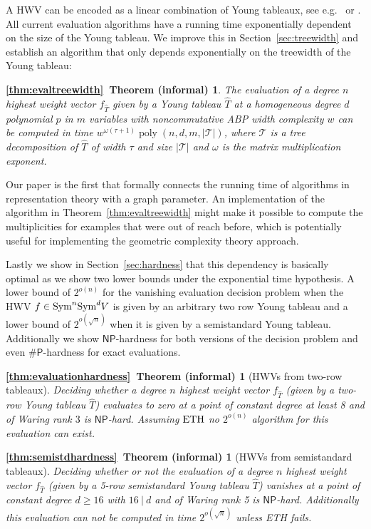 \documentclass[10pt,a4paper]{article}
\numberwithin{equation}{section}
\newtheorem*{theorem*thm:evaltreewidth}{\ref{thm:evaltreewidth}~Theorem (informal)}
\newtheorem*{theorem*thm:evaluationhardness}{\ref{thm:evaluationhardness}~Theorem (informal)}
\newtheorem*{theorem*thm:semistdhardness}{\ref{thm:semistdhardness}~Theorem (informal)}
\theoremstyle{definition}
\newcommand{\Sym}{\textup{Sym}}
\newcommand{\CT}{\mathcal{T}}
\newcommand{\PP}{\ensuremath{\mathsf{P}}}
\newcommand{\NP}{\ensuremath{\mathsf{NP}}}
\newcommand{\ETH}{\ensuremath{\textup{ETH}}}
\DeclareMathOperator{\poly}{poly}
\begin{document}
A HWV can be encoded as a linear combination of Young tableaux, see e.g.~\cite[\S3.9]{Ott:13} or \cite[Sec.~4.3]{ike:12b}.
All current evaluation algorithms have a running time exponentially dependent on the size of the Young tableau.
We improve this in Section~\ref{sec:treewidth} and establish an algorithm that only depends exponentially on the treewidth of the Young tableau:
\begin{theorem*thm:evaltreewidth}
The evaluation of a degree $n$ highest weight vector $f_{\hat T}$ given by a Young tableau $\hat{T}$ 
at a homogeneous degree $d$ polynomial $p$ in $m$ variables with noncommutative ABP width complexity $w$ can be computed in time $w^{\omega(\tau+1)}\poly(n,d,m,|\CT|)$,
where $\CT$ is a tree decomposition of $\hat T$ of width $\tau$ and size $|\CT|$ and $\omega$ is the matrix multiplication exponent.
\end{theorem*thm:evaltreewidth}

Our paper is the first that formally connects the running time of algorithms in representation theory with a graph parameter. An implementation of the algorithm in Theorem~\ref{thm:evaltreewidth} might make it possible to compute the multiplicities for examples that were out of reach before, which is potentially useful for implementing the geometric complexity theory approach.

Lastly we show in Section~\ref{sec:hardness} that this dependency is basically optimal as we show two lower bounds under the exponential time hypothesis.
A lower bound of $2^{o(n)}$ for the vanishing evaluation decision problem when the HWV $f \in \Sym^n\Sym^d V$ is given by an arbitrary two row Young tableau and a lower bound of $2^{o(\sqrt{n})}$ when it is given by a semistandard Young tableau.
Additionally we show $\NP$-hardness for both versions of the decision problem and even $\#\PP$-hardness for exact evaluations.

\begin{theorem*thm:evaluationhardness}[HWVs from two-row tableaux]
    Deciding whether a degree $n$ highest weight vector $f_{\hat{T}}$ (given by a two-row Young tableau $\hat{T}$) evaluates to zero at a point of constant degree at least 8 and of Waring rank $3$ is $\NP$-hard.
    Assuming $\ETH$ no $2^{o(n)}$ algorithm for this evaluation can exist.
\end{theorem*thm:evaluationhardness}

\begin{theorem*thm:semistdhardness}[HWVs from semistandard tableaux]
    Deciding whether or not the evaluation of a degree $n$ highest weight vector $f_{\hat{T}}$ (given by a 5-row semistandard Young tableau $\hat{T}$) vanishes at a point of constant degree $d \geq 16$ with $16~|~d$ and of Waring rank 5 is $\NP$-hard.
    Additionally this evaluation can not be computed in time $2^{o(\sqrt{n})}$ unless ETH fails.
\end{theorem*thm:semistdhardness}
\end{document}
